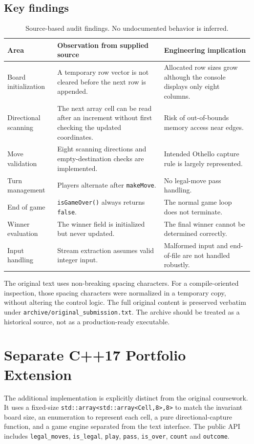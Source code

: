 \documentclass[11pt,a4paper]{article}
\newcommand{\code}[1]{\texttt{#1}}
\begin{document}
\subsection{Key findings}
\begin{table}[htbp]\centering\small
\begin{tabular}{@{}p{32mm}p{61mm}p{55mm}@{}}\toprule
Area & Observation from supplied source & Engineering implication\\\midrule
Board initialization & A temporary row vector is not cleared before the next row is appended. & Allocated row sizes grow although the console displays only eight columns.\\
Directional scanning & The next array cell can be read after an increment without first checking the updated coordinates. & Risk of out-of-bounds memory access near edges.\\
Move validation & Eight scanning directions and empty-destination checks are implemented. & Intended Othello capture rule is largely represented.\\
Turn management & Players alternate after \code{makeMove}. & No legal-move pass handling.\\
End of game & \code{isGameOver()} always returns \code{false}. & The normal game loop does not terminate.\\
Winner evaluation & The winner field is initialized but never updated. & The final winner cannot be determined correctly.\\
Input handling & Stream extraction assumes valid integer input. & Malformed input and end-of-file are not handled robustly.\\\bottomrule
\end{tabular}\caption{Source-based audit findings. No undocumented behavior is inferred.}\end{table}

The original text uses non-breaking spacing characters. For a compile-oriented inspection, those spacing characters were normalized in a temporary copy, without altering the control logic. The full original content is preserved verbatim under \code{archive/original\_submission.txt}. The archive should be treated as a historical source, not as a production-ready executable.

\section{Separate C++17 Portfolio Extension}
The additional implementation is explicitly distinct from the original coursework. It uses a fixed-size \code{std::array<std::array<Cell,8>,8>} to match the invariant board size, an enumeration to represent each cell, a pure directional-capture function, and a game engine separated from the text interface. The public API includes \code{legal\_moves}, \code{is\_legal}, \code{play}, \code{pass}, \code{is\_over}, \code{count} and \code{outcome}.
\end{document}
